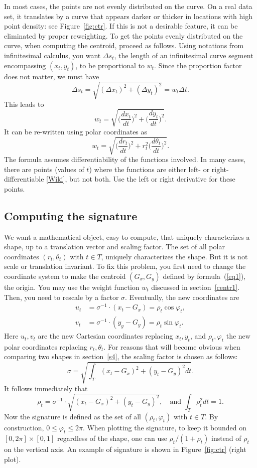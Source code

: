 \documentclass[oneside,10pt]{book}
\begin{document}
In most cases, the points are not evenly distributed on the curve. On a real data set, it translates by a curve that appears darker or thicker in locations with high point density: see Figure~\ref{fig:ctr}. If this is not a desirable feature, it can be eliminated by proper reweighting. To get the points evenly distributed on the curve, when computing the centroid, proceed as follows. Using notations from infinitesimal calculus, you want $\Delta s_t$, the length of an infinitesimal curve segment encompassing $(x_t,y_t)$, to be proportional to $w_t$. Since the proportion factor does not matter, we must have 
$$\Delta s_t = \sqrt{(\Delta x_t)^2 +(\Delta y_t)^2}= w_t \Delta t.$$
This leads to
$$w_t = \sqrt{\Big(\frac{dx_t}{dt}\Big)^2 + \Big(\frac{dy_t}{dt}\Big)^2}.$$
It can be re-written using polar coordinates as
$$w_t=\sqrt{\Big(\frac{dr_t}{dt}\Big)^2 + r_t^2\Big(\frac{d\theta_t}{dt}\Big)^2}.$$
The formula assumes differentiability of the functions involved. In many cases, there are points (values of $t$) where the functions are either left- or right-differentiable [\href{https://en.wikipedia.org/wiki/Semi-differentiability}{Wiki}], but not both. Use the left or right derivative for these points. 


\subsection{Computing the signature}

We want a mathematical object, easy to compute, that uniquely characterizes a shape, up to a translation vector and scaling factor. The set of all polar coordinates $(r_t,\theta_t)$ with $t\in T$, uniquely characterizes the shape. But it is not scale or translation invariant. To fix this problem, you first need to change the coordinate system to make the centroid $(G_x, G_y)$ defined by formula~(\ref{eq1}), the origin. You may use the weight function $w_t$ discussed in section~\ref{centr1}.  Then, you need to rescale by a factor $\sigma$. Eventually, the new coordinates are 
\begin{align}
u_t & = \sigma^{-1} \cdot (x_t-G_x) = \rho_t \cos\varphi_t, \nonumber \\
v_t & = \sigma^{-1} \cdot (y_y-G_y) = \rho_t \sin\varphi_t. \nonumber
\end{align}
Here $u_t,v_t$ are the new Cartesian coordinates replacing $x_t, y_t$, and $\rho_t,\varphi_t$ the new polar coordinates replacing $r_t,\theta_t$. For reasons that will become obvious 
when comparing two shapes in section~\ref{s4}, the scaling factor is chosen as follows:
$$\sigma = \sqrt{\int_T (x_t-G_x)^2 + (y_t-G_y)^2 dt}.$$
It follows immediately that
\begin{equation}
\rho_t =\sigma^{-1}\cdot\sqrt{(x_t-G_x)^2 + (y_t-G_y)^2}, \quad \text{and }\int_T \rho^2_t dt = 1. \label{eq3}
\end{equation}
Now the signature is defined as the set of all $(\rho_t,\varphi_t)$ with $t\in T$. By construction, $0\leq \varphi_t\leq 2\pi$. When plotting the signature, to keep it  bounded on $[0, 2\pi] \times [0, 1]$ regardless of the shape, one can use $\rho_t/(1+\rho_t)$ instead of $\rho_t$ on the vertical axis. An example of signature is shown in Figure~\ref{fig:ctr} (right plot). 
\end{document}
